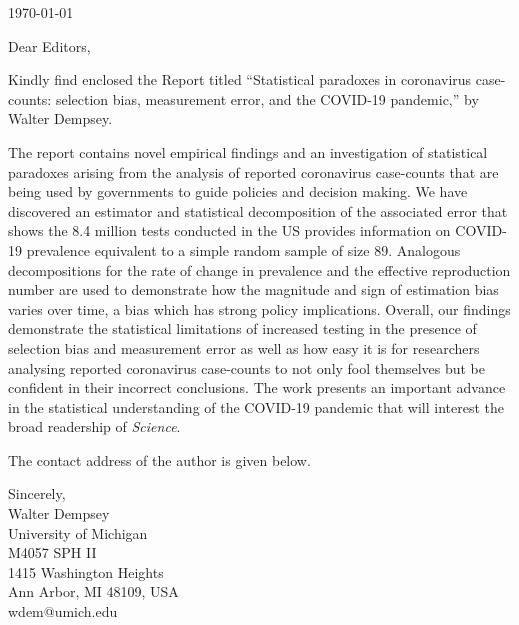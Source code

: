 \documentclass[11pt]{article}\usepackage{epsfig}\usepackage{setspace}%
\begin{document}







\noindent \today

\noindent Dear Editors,

Kindly find enclosed the Report titled ``Statistical paradoxes in coronavirus case-counts: selection bias, measurement error, and the COVID-19 pandemic,'' by Walter Dempsey.

The report contains novel empirical findings and an investigation of statistical paradoxes arising from the analysis of reported coronavirus case-counts that are being used by governments to guide policies and decision making.
We have discovered an estimator and statistical decomposition of the associated error that shows the 8.4 million tests conducted in the US provides information on COVID-19 prevalence equivalent to a simple random sample of size 89.
Analogous decompositions for the rate of change in prevalence and the effective reproduction number are used to demonstrate how the magnitude and sign of estimation bias varies over time, a bias which has strong policy implications.
Overall, our findings demonstrate the statistical limitations of increased testing in the presence of selection bias and measurement error as well as how easy it is for researchers analysing reported coronavirus case-counts to not only fool themselves but be confident in their incorrect conclusions.
The work presents an important advance in the statistical understanding of the COVID-19 pandemic that will interest the broad readership of {\em Science}.

\noindent The contact address of the author is given below.

\noindent Sincerely,\\

\noindent Walter Dempsey\\
University of Michigan\\
M4057 SPH II \\
1415 Washington Heights \\
Ann Arbor, MI 48109, USA\\
wdem@umich.edu
\end{document}

